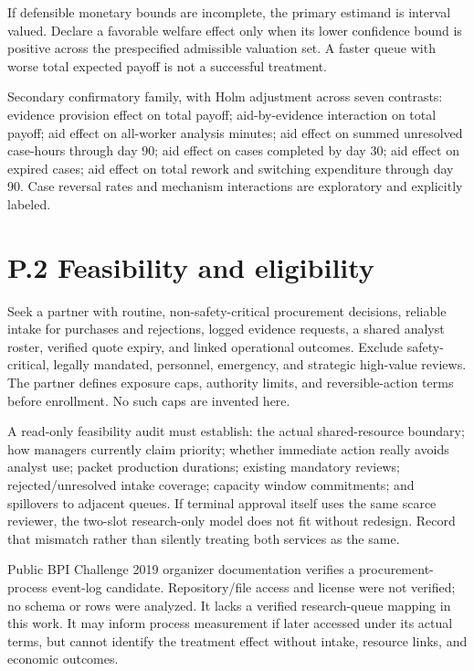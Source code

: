 \documentclass[
  11pt,
]{article}
\begin{document}
If defensible monetary bounds are incomplete, the primary estimand is
interval valued. Declare a favorable welfare effect only when its lower
confidence bound is positive across the prespecified admissible
valuation set. A faster queue with worse total expected payoff is not a
successful treatment.

Secondary confirmatory family, with Holm adjustment across seven
contrasts: evidence provision effect on total payoff; aid-by-evidence
interaction on total payoff; aid effect on all-worker analysis minutes;
aid effect on summed unresolved case-hours through day 90; aid effect on
cases completed by day 30; aid effect on expired cases; aid effect on
total rework and switching expenditure through day 90. Case reversal
rates and mechanism interactions are exploratory and explicitly labeled.

\section{P.2 Feasibility and
eligibility}\label{p.2-feasibility-and-eligibility}

Seek a partner with routine, non-safety-critical procurement decisions,
reliable intake for purchases and rejections, logged evidence requests,
a shared analyst roster, verified quote expiry, and linked operational
outcomes. Exclude safety-critical, legally mandated, personnel,
emergency, and strategic high-value reviews. The partner defines
exposure caps, authority limits, and reversible-action terms before
enrollment. No such caps are invented here.

A read-only feasibility audit must establish: the actual shared-resource
boundary; how managers currently claim priority; whether immediate
action really avoids analyst use; packet production durations; existing
mandatory reviews; rejected/unresolved intake coverage; capacity window
commitments; and spillovers to adjacent queues. If terminal approval
itself uses the same scarce reviewer, the two-slot research-only model
does not fit without redesign. Record that mismatch rather than silently
treating both services as the same.

Public BPI Challenge 2019 organizer documentation verifies a
procurement-process event-log candidate. Repository/file access and
license were not verified; no schema or rows were analyzed. It lacks a
verified research-queue mapping in this work. It may inform process
measurement if later accessed under its actual terms, but cannot
identify the treatment effect without intake, resource links, and
economic outcomes.
\end{document}
